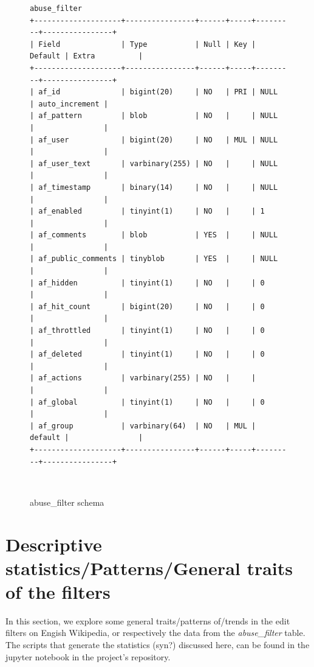\begin{figure}
\begin{verbatim}
abuse_filter
+--------------------+----------------+------+-----+---------+----------------+
| Field              | Type           | Null | Key | Default | Extra          |
+--------------------+----------------+------+-----+---------+----------------+
| af_id              | bigint(20)     | NO   | PRI | NULL    | auto_increment |
| af_pattern         | blob           | NO   |     | NULL    |                |
| af_user            | bigint(20)     | NO   | MUL | NULL    |                |
| af_user_text       | varbinary(255) | NO   |     | NULL    |                |
| af_timestamp       | binary(14)     | NO   |     | NULL    |                |
| af_enabled         | tinyint(1)     | NO   |     | 1       |                |
| af_comments        | blob           | YES  |     | NULL    |                |
| af_public_comments | tinyblob       | YES  |     | NULL    |                |
| af_hidden          | tinyint(1)     | NO   |     | 0       |                |
| af_hit_count       | bigint(20)     | NO   |     | 0       |                |
| af_throttled       | tinyint(1)     | NO   |     | 0       |                |
| af_deleted         | tinyint(1)     | NO   |     | 0       |                |
| af_actions         | varbinary(255) | NO   |     |         |                |
| af_global          | tinyint(1)     | NO   |     | 0       |                |
| af_group           | varbinary(64)  | NO   | MUL | default |                |
+--------------------+----------------+------+-----+---------+----------------+
\end{verbatim}
  \caption{abuse\_filter schema}~\label{fig:db-schemas-af}
\end{figure}

\section{Descriptive statistics/Patterns/General traits of the filters}
\label{sec:patterns}

In this section, we explore some general traits/patterns of/trends in the edit filters on Engish Wikipedia, or respectively the data from the \emph{abuse\_filter} table.
The scripts that generate the statistics (syn?) discussed here, can be found in the jupyter notebook in the project's repository. %

